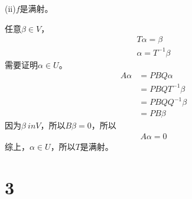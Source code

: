 \documentclass{article}
\begin{document}
\begin{itemize}
        (ii)$f$是满射。

        任意$\beta \in V$，
        \begin{align*}
          T \alpha = \beta \\
          \alpha = T^{-1} \beta
        \end{align*}
        需要证明$\alpha \in U$。
        \begin{align*}
          A \alpha & = PBQ \alpha       \\
                   & = PBQ T^{-1} \beta \\
                   & = PBQ Q^{-1} \beta \\
                   & = P B \beta 
        \end{align*}
        因为$\beta \ in V$，所以$B \beta = 0$，所以
        \begin{align*}
          A \alpha = 0
        \end{align*}
        综上，$\alpha \in U$，所以$T$是满射。

\end{itemize}

\section*{3}
\end{document}
